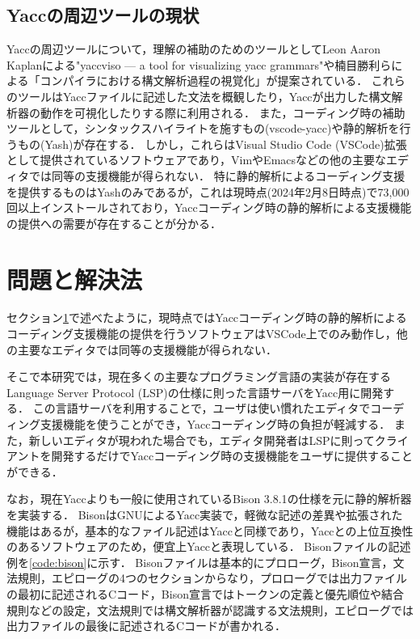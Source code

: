 \documentclass[fontsize=9bp,twocolumn,column_gap=2.36zw,a4paper,report]{jlreq}
\begin{document}
\section{Yaccの周辺ツールの現状}\label{sec:yacc_tools}

Yaccの周辺ツールについて，理解の補助のためのツールとしてLeon Aaron Kaplanによる"yaccviso — a tool for visualizing yacc grammars"\cite{yaccviso}や楠目勝利らによる「コンパイラにおける構文解析過程の視覚化」\cite{parserviso}が提案されている．
これらのツールはYaccファイルに記述した文法を概観したり，Yaccが出力した構文解析器の動作を可視化したりする際に利用される．
また，コーディング時の補助ツールとして，シンタックスハイライトを施すもの(vscode-yacc\cite{vscode-yacc})や静的解析を行うもの(Yash\cite{yash})が存在する．
しかし，これらはVisual Studio Code (VSCode)拡張として提供されているソフトウェアであり，VimやEmacsなどの他の主要なエディタでは同等の支援機能が得られない．
特に静的解析によるコーディング支援を提供するものはYashのみであるが，これは現時点(2024年2月8日時点)で73,000回以上インストールされており，Yaccコーディング時の静的解析による支援機能の提供への需要が存在することが分かる．

\begin{figure}[h]
\end{figure}

\chapter{問題と解決法}\label{ch:probsolv}

セクション\ref{sec:yacc_tools}で述べたように，現時点ではYaccコーディング時の静的解析によるコーディング支援機能の提供を行うソフトウェアはVSCode上でのみ動作し，他の主要なエディタでは同等の支援機能が得られない．\par
そこで本研究では，現在多くの主要なプログラミング言語の実装が存在するLanguage Server Protocol (LSP)\cite{lsp}の仕様に則った言語サーバをYacc用に開発する．
この言語サーバを利用することで，ユーザは使い慣れたエディタでコーディング支援機能を使うことができ，Yaccコーディング時の負担が軽減する．
また，新しいエディタが現われた場合でも，エディタ開発者はLSPに則ってクライアントを開発するだけでYaccコーディング時の支援機能をユーザに提供することができる．\par
なお，現在Yaccよりも一般に使用されているBison 3.8.1\cite{bison}の仕様を元に静的解析器を実装する．
BisonはGNUによるYacc実装で，軽微な記述の差異や拡張された機能はあるが，基本的なファイル記述はYaccと同様であり，Yaccとの上位互換性のあるソフトウェアのため，便宜上Yaccと表現している．
Bisonファイルの記述例を\ref{code:bison}に示す．
Bisonファイルは基本的にプロローグ，Bison宣言，文法規則，エピローグの4つのセクションからなり，プロローグでは出力ファイルの最初に記述されるCコード，Bison宣言ではトークンの定義と優先順位や結合規則などの設定，文法規則では構文解析器が認識する文法規則，エピローグでは出力ファイルの最後に記述されるCコードが書かれる．
\end{document}
